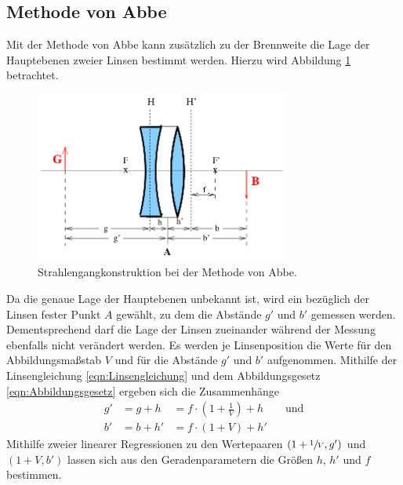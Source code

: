 \subsection{Methode von Abbe}

Mit der Methode von Abbe kann zusätzlich zu der Brennweite die Lage der Hauptebenen zweier Linsen bestimmt werden. 
Hierzu wird Abbildung \ref{fig:Abbe} betrachtet. 
\begin{figure}
    \centering
    \includegraphics[width=0.75\textwidth]{plots/2LinsenTeil2.png}
    \caption{Strahlengangkonstruktion bei der Methode von Abbe\cite{Versuchsanleitung}.}
    \label{fig:Abbe}
\end{figure}
Da die genaue Lage der Hauptebenen unbekannt ist, wird ein bezüglich der Linsen fester Punkt $A$ gewählt, zu dem die Abstände $g'$ und $b'$ gemessen werden. 
Dementsprechend darf die Lage der Linsen zueinander während der Messung ebenfalls nicht verändert werden.
Es werden je Linsenposition die Werte für den Abbildungsmaßstab $V$ und für die Abstände $g'$ und $b'$ aufgenommen. 
Mithilfe der Linsengleichung \eqref{eqn:Linsengleichung} und dem Abbildungsgesetz \eqref{eqn:Abbildungsgesetz} ergeben sich die Zusammenhänge 
\begin{align}
    g'&=g+h &=f\cdot (1+\frac{1}{V})+h \qquad \text{und}\\
    b'&=b+h'&=f\cdot (1+V)+h'
\end{align}
Mithilfe zweier linearer Regressionen zu den Wertepaaren $(1+\sfrac{1}{V},g')$ und $(1+V,b')$ lassen sich aus den Geradenparametern 
die Größen $h$, $h'$ und $f$ bestimmen\cite{Versuchsanleitung}. 